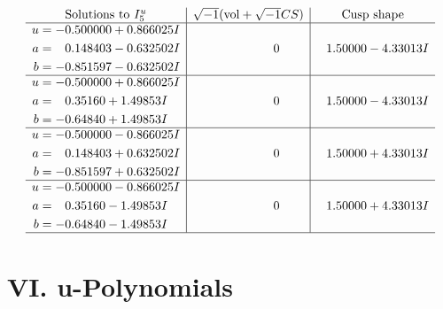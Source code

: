 \documentclass[1p]{elsarticle_modified}
\theoremstyle{definition}
\newcommand{\I}{\sqrt{-1}}
\begin{document}
$$\begin{array}{c|c|c}  
\text{Solutions to }I^u_{5}& \I (\text{vol} + \sqrt{-1}CS) & \text{Cusp shape}\\
 \hline 
\begin{aligned}
u &= -0.500000 + 0.866025 I \\
a &= \phantom{-}0.148403 - 0.632502 I \\
b &= -0.851597 - 0.632502 I\end{aligned}
 & \phantom{-0.000000 } 0 & \phantom{-}1.50000 - 4.33013 I \\ \hline\begin{aligned}
u &= -0.500000 + 0.866025 I \\
a &= \phantom{-}0.35160 + 1.49853 I \\
b &= -0.64840 + 1.49853 I\end{aligned}
 & \phantom{-0.000000 } 0 & \phantom{-}1.50000 - 4.33013 I \\ \hline\begin{aligned}
u &= -0.500000 - 0.866025 I \\
a &= \phantom{-}0.148403 + 0.632502 I \\
b &= -0.851597 + 0.632502 I\end{aligned}
 & \phantom{-0.000000 } 0 & \phantom{-}1.50000 + 4.33013 I \\ \hline\begin{aligned}
u &= -0.500000 - 0.866025 I \\
a &= \phantom{-}0.35160 - 1.49853 I \\
b &= -0.64840 - 1.49853 I\end{aligned}
 & \phantom{-0.000000 } 0 & \phantom{-}1.50000 + 4.33013 I\\
 \hline 
 \end{array}$$\newpage
\newpage\renewcommand{\arraystretch}{1}
\centering \section*{ VI. u-Polynomials}
\end{document}
